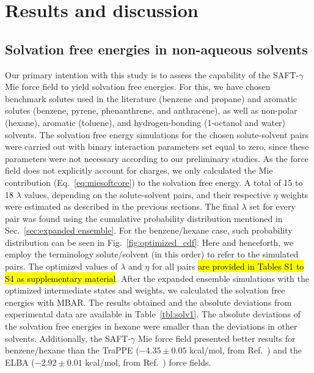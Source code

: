 \documentclass[final,12p,times,twocolumn]{elsarticle}
\begin{document}
	\section{Results and discussion}
	\label{sec:results}

	\subsection{Solvation free energies in non-aqueous solvents}
	\label{sec:non-aqueous}

	Our primary intention with this study is to assess the capability of the SAFT-$\gamma$ Mie force field to yield solvation free energies. For this, we have chosen benchmark solutes used in the literature (benzene and propane) and aromatic solutes (benzene, pyrene, phenanthrene, and anthracene), as well as non-polar (hexane), aromatic (toluene), and hydrogen-bonding (1-octanol and water) solvents. The solvation free energy simulations for the chosen solute-solvent pairs were carried out with binary interaction parameters set equal to zero, since these parameters were not necessary according to our preliminary studies. As the force field does not explicitly account for charges, we only calculated the Mie contribution (Eq.~\eqref{eq:miesoftcore}) to the solvation free energy. A total of 15 to 18 $\lambda$ values, depending on the solute-solvent pairs, and their respective $\eta$ weights were estimated as described in the previous sections. The final $\lambda$ set for every pair was found using the cumulative probability distribution mentioned in Sec.~\ref{sec:expanded ensemble}. For the benzene/hexane case, such probability distribution can be seen in Fig.~\ref{fig:optimized_cdf}. Here and henceforth, we employ the terminology solute/solvent (in this order) to refer to the simulated pairs. The optimized values of $\lambda$ and $\eta$ for all pairs \hl{are provided in Tables S1 to S4 as supplementary material}.
	After the expanded ensemble simulations with the optimized intermediate states and weights, we calculated the solvation free energies with MBAR. The results obtained and the absolute deviations from experimental data \cite{doi:10.1021/ci034120c} are available in Table~\ref{tbl:solv1}. The absolute deviations of the solvation free energies in hexane were smaller than the deviations in other solvents.
	Additionally, the SAFT-$\gamma$ Mie force field presented better results for benzene/hexane than the TraPPE ($- 4.35  \pm 0.05$ kcal/mol, from Ref.~) and the ELBA ($-2.92 \pm 0.01$ kcal/mol, from Ref.~) force fields.
\end{document}
